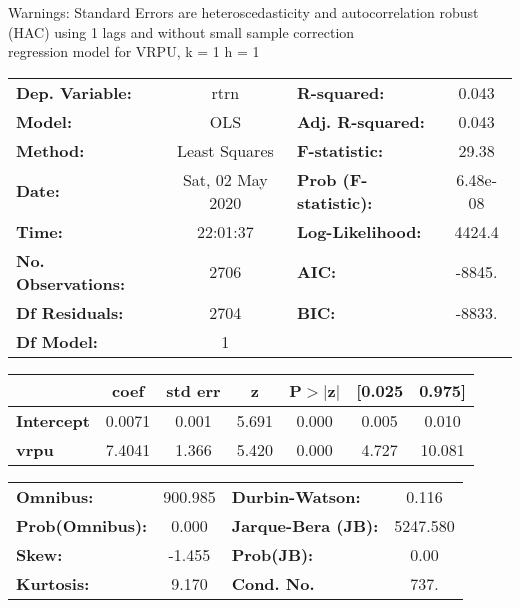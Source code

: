 Warnings: \newline
 [1] Standard Errors are heteroscedasticity and autocorrelation robust (HAC) using 1 lags and without small sample correction\\ 

regression model for VRPU, k = 1 h = 1\begin{center}
\begin{tabular}{lclc}
\toprule
\textbf{Dep. Variable:}    &       rtrn       & \textbf{  R-squared:         } &     0.043   \\
\textbf{Model:}            &       OLS        & \textbf{  Adj. R-squared:    } &     0.043   \\
\textbf{Method:}           &  Least Squares   & \textbf{  F-statistic:       } &     29.38   \\
\textbf{Date:}             & Sat, 02 May 2020 & \textbf{  Prob (F-statistic):} &  6.48e-08   \\
\textbf{Time:}             &     22:01:37     & \textbf{  Log-Likelihood:    } &    4424.4   \\
\textbf{No. Observations:} &        2706      & \textbf{  AIC:               } &    -8845.   \\
\textbf{Df Residuals:}     &        2704      & \textbf{  BIC:               } &    -8833.   \\
\textbf{Df Model:}         &           1      & \textbf{                     } &             \\
\bottomrule
\end{tabular}
\begin{tabular}{lcccccc}
                   & \textbf{coef} & \textbf{std err} & \textbf{z} & \textbf{P$> |$z$|$} & \textbf{[0.025} & \textbf{0.975]}  \\
\midrule
\textbf{Intercept} &       0.0071  &        0.001     &     5.691  &         0.000        &        0.005    &        0.010     \\
\textbf{vrpu}      &       7.4041  &        1.366     &     5.420  &         0.000        &        4.727    &       10.081     \\
\bottomrule
\end{tabular}
\begin{tabular}{lclc}
\textbf{Omnibus:}       & 900.985 & \textbf{  Durbin-Watson:     } &    0.116  \\
\textbf{Prob(Omnibus):} &   0.000 & \textbf{  Jarque-Bera (JB):  } & 5247.580  \\
\textbf{Skew:}          &  -1.455 & \textbf{  Prob(JB):          } &     0.00  \\
\textbf{Kurtosis:}      &   9.170 & \textbf{  Cond. No.          } &     737.  \\
\bottomrule
\end{tabular}
\end{center}


